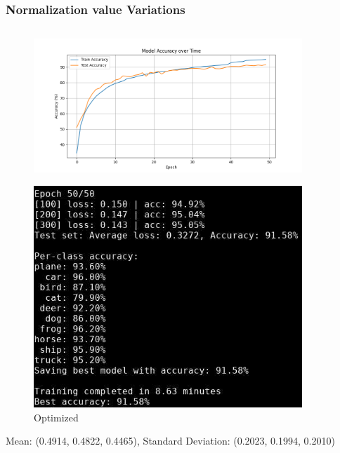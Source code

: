 \begin{frame}
\frametitle{Normalization value Variations}
\begin{columns}
    \begin{column}{0.4\textwidth}
        \vspace{-0.1cm}
        \begin{figure}[t]
            \centering
            \vspace{-0.4cm}
            \includegraphics[width=0.9\textwidth]{media/1stAssignment/cifar10_cnn_accuracy.png}
        \end{figure}
        \vspace{-0.6cm}
        \begin{figure}[t]
            \centering
            \includegraphics[width=0.9\textwidth]{media/1stAssignment/cnn_epoch_50.png}
            \vspace{-0.3cm}
            \caption{Optimized}
        \end{figure}
        \vspace{-0.6cm}
        \center \tiny Mean: (0.4914, 0.4822, 0.4465),
        \vspace{-0.3cm}
        \center \tiny Standard Deviation: (0.2023, 0.1994, 0.2010)
    \end{column}


\end{columns}
\end{frame}
